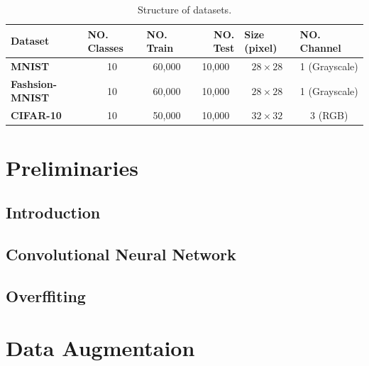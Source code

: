 \begin{table}[]
  \label{dataset_table}
  \begin{tabular}{
      l |
      c
      c
      c
      c
      c}
    \hline
    {\textbf{Dataset}}        & \multicolumn{1}{l}{{\textbf{NO. Classes}}} & \multicolumn{1}{l}{{\textbf{NO. Train}}} & \multicolumn{1}{r}{{\textbf{NO. Test}}} & \multicolumn{1}{l}{{\textbf{Size (pixel)}}} & \multicolumn{1}{l}{{\textbf{NO. Channel}}} \\ \hline
    {\textbf{MNIST}}          & 10                                         & 60,000
    & 10,000                                  & $28\times28$                                & 1
    (Grayscale)                              \\
    {\textbf{Fashsion-MNIST}} & 10                                         & 60,000
    &10,000                                         &  $28\times28$
    &  1 (Grayscale)                                         \\
    {\textbf{CIFAR-10}}       & 10                                         & 50,000
    & 10,000                                  & $32\times32$                                & 3
    (RGB)                                         \\ \hline
  \end{tabular}
  \caption{Structure of datasets.}
\end{table}


\chapter{Preliminaries}
\section{Introduction}
\section{Convolutional Neural Network}
\section{Overffiting}


\chapter{Data Augmentaion}

